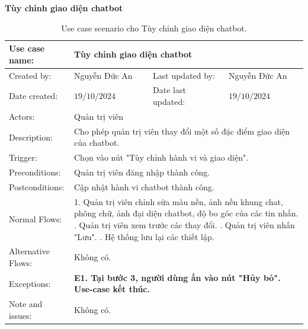 \textbf{Tùy chỉnh giao diện chatbot}
\begin{table}[H]
	\centering
	\begin{tabular}{|l|l|l|l|} 
		\hline Use case name: & \multicolumn{3}{|l|}{Tùy chỉnh giao diện chatbot} \\ 
		\hline Created by: & Nguyễn Đức An & Last updated by: & Nguyễn Đức An \\ 
		\hline Date created: & $19 / 10 / 2024$ & Date last updated: & $19 / 10 / 2024$\\ 
		\hline Actors: & \multicolumn{3}{|l|}{ Quản trị viên } \\ 
		\hline Description: & \multicolumn{3}{|p{12cm}|}{ Cho phép quản trị viên thay đổi một số đặc điểm giao diện của chatbot. } \\ 
		\hline Trigger: & \multicolumn{3}{|p{12cm}|}{ Chọn vào nút "Tùy chỉnh hành vi và giao diện". } \\ 
		\hline Preconditions: & \multicolumn{3}{|p{12cm}|}{ 
			Quản trị viên đăng nhập thành công. 
		} \\ 
		\hline Postconditions: & \multicolumn{3}{|p{12cm}|}{ 
			Cập nhật hành vi chatbot thành công. 
		} \\ 
		\hline Normal Flows: & \multicolumn{3}{|p{12cm}|}{ 
			1. Quản trị viên chỉnh sửa màu nền, ảnh nền khung chat, phông chữ, ảnh đại diện chatbot, độ bo góc của các tin nhắn. \newline 
			2. Quản trị viên xem trước các thay đổi. \newline
			3. Quản trị viên nhấn "Lưu". \newline
			4. Hệ thống lưu lại các thiết lập.
		} \\ 
		\hline Alternative Flows: & \multicolumn{3}{|p{12cm}|}{ Không có. } \\ 
		\hline Exceptions: & \multicolumn{3}{|p{12cm}|}{ 
			\textbf{E1. Tại bước 3, người dùng ấn vào nút "Hủy bỏ". Use-case kết thúc.  }
		} \\ 
		\hline Note and issues: & \multicolumn{3}{|p{12cm}|}{ Không có. } \\ 
		\hline
	\end{tabular}
	\caption{Use case scenario cho Tùy chỉnh giao diện chatbot.}
\end{table}


